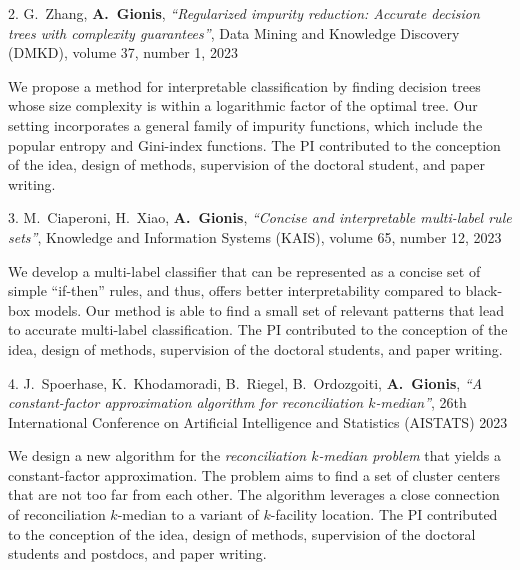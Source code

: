 \documentclass[a4paper,11pt]{article}
\begin{document}
\textbibspace

\item[{2.}]
{G.\ Zhang, \textbf{A.\ Gionis}},
{\em ``Regularized impurity reduction: Accurate decision trees with complexity guarantees''},
Data Mining and Knowledge Discovery (DMKD), 
volume 37, number 1, 2023
%
\item[]
We propose a method for interpretable classification by finding decision trees
whose size complexity is within a logarithmic factor of the optimal tree.
Our setting incorporates a general family of impurity functions, 
which include the popular entropy and Gini-index functions.
The PI contributed to the conception of the idea, 
design of methods, supervision of the doctoral student, and paper writing.


\textbibspace

\item[{3.}]
{ M.\ Ciaperoni, H.\ Xiao, \textbf{A.\ Gionis}},
{\em ``Concise and interpretable multi-label rule sets''}, 
Knowledge and Information Systems (KAIS),
volume 65, number 12, 2023
%
\item[]
We develop a multi-label classifier that can be represented as a concise set of simple ``if-then'' rules, 
and thus, offers better interpretability compared to black-box models. 
Our method is able to find a small set of relevant patterns that lead to accurate multi-label classification.
The PI contributed to the conception of the idea, 
design of methods, supervision of the doctoral students, and paper writing.

\textbibspace

\item[{4.}]
{J.\ Spoerhase, K.\ Khodamoradi, B.\ Riegel, B.\ Ordozgoiti, \textbf{A.\ Gionis}},
{\em ``A constant-factor approximation algorithm for reconciliation $k$-median''}, 
26th International Conference on Artificial Intelligence and Statistics (AISTATS) 2023
%
\item[]
We design a new algorithm for the \emph{reconciliation $k$-median problem} 
that yields a constant-factor approximation. 
The problem aims to find a set of cluster centers that are not too far from each other. 
The algorithm leverages a close connection of reconciliation $k$-median to a variant 
of $k$-facility location.
The PI contributed to the conception of the idea, 
design of methods, supervision of the doctoral students and postdocs, and paper writing.
\end{document}

